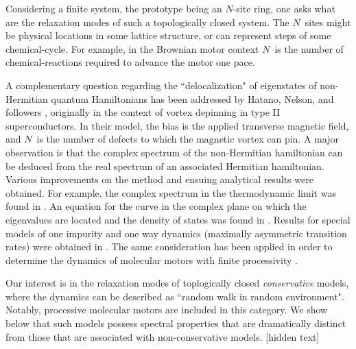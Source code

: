\documentclass[aps,pre,floats,floatfix,twocolumn]{revtex4}
\newcommand{\hide}[1]{}
\newcommand{\rmrk}[1]{{\color[rgb]{0.6,0,0.1} #1}}
\begin{document}
Considering a finite system, the prototype being an $N$-site ring, one
asks what are the relaxation modes of such a topologically closed system. 
The $N$~sites might be physical locations in some lattice 
structure, or can represent steps of some chemical-cycle. 
For example, in the Brownian motor context $N$~is the number 
of chemical-reactions required to advance the motor one pace. 


A complementary question regarding  the ``delocalization" of eigenstates 
of non-Hermitian quantum Hamiltonians has been addressed 
by Hatano, Nelson, and followers \cite{Hatano1,Hatano2,Shnerb1},  
originally in the context of vortex depinning in type II superconductors. 
In their model, the bias is the applied transverse magnetic field, 
and $N$~is the number of defects to which the magnetic vortex can pin.
A major observation is that the complex spectrum of the non-Hermitian hamiltonian 
can be deduced from the real spectrum of an associated Hermitian hamiltonian. 
%
Various improvements on the method and ensuing analytical results were obtained.
For example, the complex spectrum in the thermodynamic limit was found in \cite{Brouwer}.
An equation for the curve in the complex plane on which the eigenvalues are located and the density of states was found in \cite{Goldsheid}.
Results for special models of one impurity and one way dynamics (maximally asymmetric transition rates) were obtained in \cite{Zee}.
%
The same consideration has been applied in order to determine 
the dynamics of molecular motors with finite processivity \cite{brm1,brm2}.


Our interest is in the relaxation modes of toplogically closed {\em conservative} models, 
where the dynamics can be described as ``random walk in random environment". 
Notably, processive molecular motors are included in this category. 
We show below that such models possess spectral properties that are 
dramatically distinct from those that are associated with non-conservative models.
%
\rmrk{[hidden text]}
\hide{
In \cite{brm1,brm2} non conservative motors are considered. It was found that under an external force and strong disorder, the motor will become localized at preferred positions yet near the stall force, localization occurs for any amount of disorder. These results were obtained by observing the numerically obtained spectrum. 
%
To summarize \cite{brm2}, they use a different method, bypassing the hermitization procedure.
The long time behavior of $v$ and $D$ is deduced by numerical observations of the lower edge of the spectrum (small $|\lambda|$).
In fact the hermitization procedure is claimed to obscure the complexity transition (we found it!).
Somehow they do not bridge between complexity of the spectrum and the sliding transition in a purely conservative model. 
They make some comments regarding complexity and sliding in the following respect.
They consider a model where there are two types of unit cells. Each unit cell is made of two bonds.
The chain is composed of unit cells drawn from a bimodal distribution. 
Real eigenvalues only appear due to non conservative diagonal disorder  (detachment rate).
They do not find an explicit crossover to complexity and do not handle the purely conservative case.
}
\end{document}
